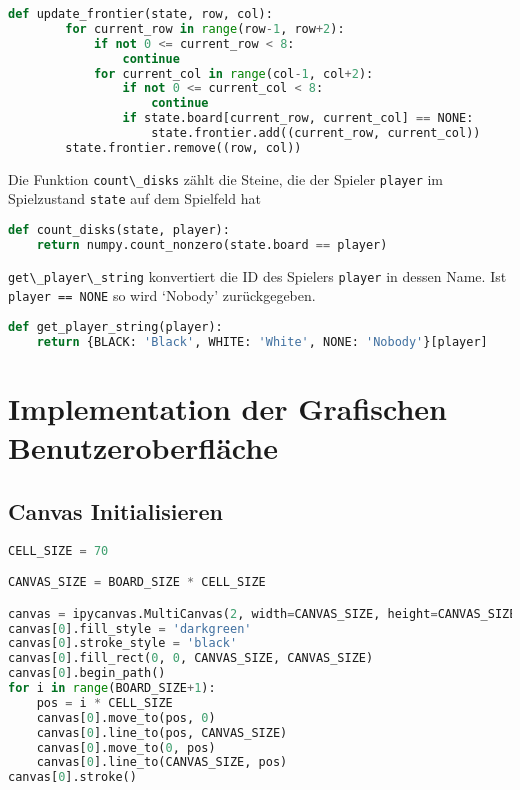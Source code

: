 \begin{lstlisting}[language=Python]
def update_frontier(state, row, col):
        for current_row in range(row-1, row+2):
            if not 0 <= current_row < 8:
                continue
            for current_col in range(col-1, col+2):
                if not 0 <= current_col < 8:
                    continue
                if state.board[current_row, current_col] == NONE:
                    state.frontier.add((current_row, current_col))
        state.frontier.remove((row, col))
\end{lstlisting}

Die Funktion \passthrough{\lstinline!count\_disks!} zählt die Steine,
die der Spieler \passthrough{\lstinline!player!} im Spielzustand
\passthrough{\lstinline!state!} auf dem Spielfeld hat

\begin{lstlisting}[language=Python]
def count_disks(state, player):
    return numpy.count_nonzero(state.board == player)
\end{lstlisting}

\passthrough{\lstinline!get\_player\_string!} konvertiert die ID des
Spielers \passthrough{\lstinline!player!} in dessen Name. Ist
\passthrough{\lstinline!player == NONE!} so wird `Nobody' zurückgegeben.

\begin{lstlisting}[language=Python]
def get_player_string(player):
    return {BLACK: 'Black', WHITE: 'White', NONE: 'Nobody'}[player]
\end{lstlisting}

\hypertarget{implementation-der-grafischen-benutzeroberfluxe4che}{%
\section{Implementation der Grafischen
Benutzeroberfläche}\label{implementation-der-grafischen-benutzeroberfluxe4che}}

\hypertarget{canvas-initialisieren}{%
\subsection{Canvas Initialisieren}\label{canvas-initialisieren}}

\begin{lstlisting}[language=Python]
CELL_SIZE = 70

CANVAS_SIZE = BOARD_SIZE * CELL_SIZE

canvas = ipycanvas.MultiCanvas(2, width=CANVAS_SIZE, height=CANVAS_SIZE)
canvas[0].fill_style = 'darkgreen'
canvas[0].stroke_style = 'black'
canvas[0].fill_rect(0, 0, CANVAS_SIZE, CANVAS_SIZE)
canvas[0].begin_path()
for i in range(BOARD_SIZE+1):
    pos = i * CELL_SIZE
    canvas[0].move_to(pos, 0)
    canvas[0].line_to(pos, CANVAS_SIZE)
    canvas[0].move_to(0, pos)
    canvas[0].line_to(CANVAS_SIZE, pos)
canvas[0].stroke()
\end{lstlisting}

